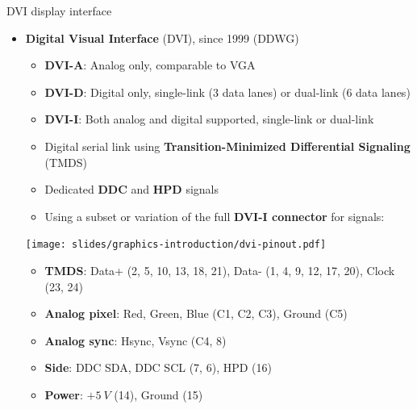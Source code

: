 \begin{frame}{DVI display interface}
  \begin{itemize}
  \item \textbf{Digital Visual Interface} (DVI), since 1999 (DDWG)
    \begin{itemize}
    \item \textbf{DVI-A}: Analog only, comparable to VGA
    \item \textbf{DVI-D}: Digital only, single-link (3 data lanes) or dual-link (6 data lanes)
    \item \textbf{DVI-I}: Both analog and digital supported, single-link or dual-link
    \item Digital serial link using \textbf{Transition-Minimized Differential Signaling} (TMDS)
    \item Dedicated \textbf{DDC} and \textbf{HPD} signals
    \item Using a subset or variation of the full \textbf{DVI-I connector} for signals:
    \end{itemize}
  \begin{center}
    \texttt{[image: slides/graphics-introduction/dvi-pinout.pdf]}
  \end{center}
  \begin{itemize}
  \item \textbf{TMDS}: Data+ {\footnotesize(2, 5, 10, 13, 18, 21)}, Data- {\footnotesize(1, 4, 9, 12, 17, 20)}, Clock {\footnotesize(23, 24)}
  \item \textbf{Analog pixel}: Red, Green, Blue {\footnotesize(C1, C2, C3)}, Ground {\footnotesize(C5)}
  \item \textbf{Analog sync}: Hsync, Vsync {\footnotesize(C4, 8)}
  \item \textbf{Side}: DDC SDA, DDC SCL {\footnotesize(7, 6)}, HPD {\footnotesize(16)}
  \item \textbf{Power}: \(+5~V\) {\footnotesize(14)}, Ground {\footnotesize(15)}
  \end{itemize}
  \end{itemize}
\end{frame}

